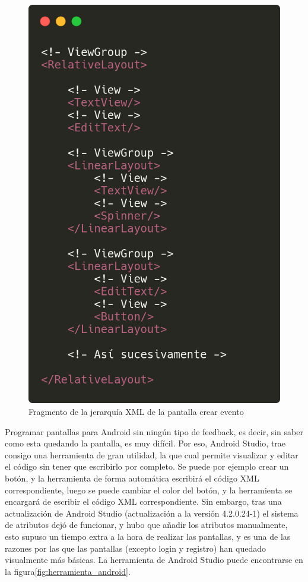 \begin{figure}[h!]
  \centering
  \includegraphics[width=0.5\linewidth]{figs/Desarrollo/Codigo/xml_jerarquia}
  \caption[XML Jerarquia]{Fragmento de la jerarquía XML de la pantalla crear evento}
  \label{fig:xml_crear_evento}
\end{figure}

Programar pantallas para Android sin ningún tipo de feedback, es decir, sin saber como esta quedando la pantalla, es muy difícil. Por eso, Android Studio, trae consigo una herramienta de gran utilidad, la que cual permite visualizar y editar el código sin tener que escribirlo por completo. Se puede por ejemplo crear un botón, y la herramienta de forma automática escribirá el código XML correspondiente, luego se puede cambiar el color del botón, y la herramienta se encargará de escribir el código XML correspondiente. Sin embargo, tras una actualización de Android Studio (actualización a la versión 4.2.0.24-1) el sistema de atributos dejó de funcionar, y hubo que añadir los atributos manualmente, esto supuso un tiempo extra a la hora de realizar las pantallas, y es una de las razones por las que las pantallas (excepto login y registro) han quedado visualmente más básicas. La herramienta de Android Studio puede encontrarse en la figura\ref{fig:herramienta_android}. \\

